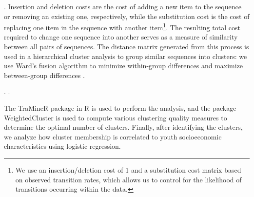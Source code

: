 \documentclass[
  a4paper, twoside, 12pt]{book}
\newcommand{\hlc}[2][color]{}
\begin{document}
\hlc[lightgray]{OMA is a statistical technique that generates a measure of the similarity or difference between individual school-to-work transition sequences by comparing all pairs of sequences and performing insertions, deletions, or substitutions of single sequence elements to transform one sequence into the other} \autocite{elzinga2003}. Insertion and deletion costs are the cost of adding a new item to the sequence or removing an existing one, respectively, while the substitution cost is the cost of replacing one item in the sequence with another item\footnote{We use an insertion/deletion cost of 1 and a substitution cost matrix based on observed transition rates, which allows us to control for the likelihood of transitions occurring within the data.}. The resulting total cost required to change one sequence into another serves as a measure of similarity between all pairs of sequences. The distance matrix generated from this process is used in a hierarchical cluster analysis to group similar sequences into clusters: we use Ward's fusion algorithm to minimize within-group differences and maximize between-group differences \autocite{dlouhy2015,achatz2022}.

\hlc[lightgray]{This method has been used to study early career patterns in Italy, Great Britain, Sweden, and West Germany }\autocite{halpin1998,anyadike-danes2005,scherer2001,scherer2005,biemann2012,achatz2022}\hlc[lightgray]{. The method has also been applied to the school-to work transition in various high-income countries }\autocite{schoon2001,mcvicar2002,brzinsky-fay2007,brzinsky-fay2014,brzinsky-fay2016,middeldorp2019}. \textcite{quintini2009}\hlc[lightgray]{ use the method to compare school-to-work transitions between youth in the United States and Europe, and find considerably more dynamism in the US. One recent study has used Optimal Matching in a cross-country study of SWTs in low- and lower-middle income countries }\autocite{pesando2021}\hlc[lightgray]{, while the only other examples of OMA using data from LMICs are a study of the distance between experienced and ideal interpersonal relationships in Malawi }\autocite{frye2015}\hlc[lightgray]{, family planning (also in Malawi, }\textcite{furnas2016}\hlc[lightgray]{), and time usage among the elderly in South Africa }\autocite{grapsa2016}.

The TraMineR package in R \autocite{gabadinho2011} is used to perform the analysis, and the package WeightedCluster \autocite{studer2013} is used to compute various clustering quality measures to determine the optimal number of clusters. Finally, after identifying the clusters, we analyze how cluster membership is correlated to youth socioeconomic characteristics using logistic regression.
\end{document}
